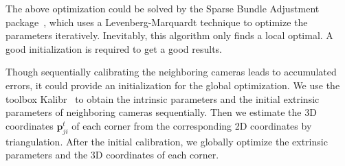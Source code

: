 The above optimization could be solved by the Sparse Bundle Adjustment package~\cite{lour09}, which uses a Levenberg-Marquardt technique to optimize the parameters iteratively. 
Inevitably, this algorithm only finds a local optimal. 
A good initialization is required to get a good results. 


Though sequentially calibrating the neighboring cameras leads to accumulated errors, it could provide an initialization for the global optimization.
% 
We use the toolbox Kalibr~\cite{Maye2013Self} to obtain the intrinsic parameters and the initial extrinsic parameters of neighboring cameras sequentially. 
%
Then we estimate the 3D coordinates $\mathbf{p}^{t}_{ji}$ of each corner from the corresponding 2D coordinates by triangulation.
%
After the initial calibration, we globally optimize the extrinsic parameters and the 3D coordinates of each corner.


